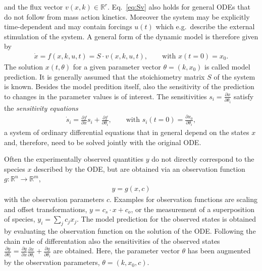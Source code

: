 \documentclass[article]{jss}
\begin{document}
and the flux vector $v(x,k)\in\mathbb R^{r}$.
Eq.~\eqref{eq:Sv} also holds for general ODEs that do not follow from mass action kinetics. Moreover the system may be explicitly time-dependent and may contain forcings $u(t)$ which e.g.~describe the external stimulation of the system. A general form of the dynamic model is therefore given by
\begin{align} 
	\dot x = f(x,k,u,t) = S \cdot v(x,k,u,t), \quad\quad \textrm{with }  x(t = 0) = x_0.
\end{align}
The solution $x(t,\theta)$ for a given parameter vector $\theta = (k, x_0)$ is called model prediction. %
It is generally assumed that the stoichiometry matrix $S$ of the system is known.
Besides the model predition itself, also the sensitivity of the prediction to changes in the parameter values is of interest. 
The sensitivities $s_i = \frac{\partial x}{\partial \theta_i}$ satisfy the \textit{sensitivity equations}
\begin{align}
	\dot s_i  = \frac{\partial f}{\partial x} s_i + \frac{\partial f}{\partial \theta_i}, \qquad \textrm{with }s_i(t = 0) = \frac{\partial x_0}{\partial \theta_i},
\end{align}
a system of ordinary differential equations that in general depend on the states $x$ and, therefore, need to be solved jointly with the original ODE. 

Often the experimentally observed quantities $y$ do not directly correspond to the species $x$ described by the ODE, but are obtained via an observation function $g: \mathbb{R}^n \rightarrow \mathbb{R}^m$,  \begin{align}
	y = g(x, c)
\end{align}
with the observation parameters $c$. Examples for observation functions are scaling and offset transformations, $y = c_s \cdot x + c_o$, or the measurement of a superposition of species, $y_i = \sum_j c_j x_j$. The model prediction for the observed states is obtained by evaluating the observation function on the solution of the ODE. Following the chain rule of differentation also the sensitivities of the observed states $\frac{\partial y}{\partial \theta_i} = \frac{\partial g}{\partial x} \frac{\partial x}{\partial\theta_i}  + \frac{\partial g}{\partial \theta_i}$ are obtained. Here, the parameter vector $\theta$ has been augmented by the observation parameters, $\theta = (k, x_0, c)$.
\end{document}
